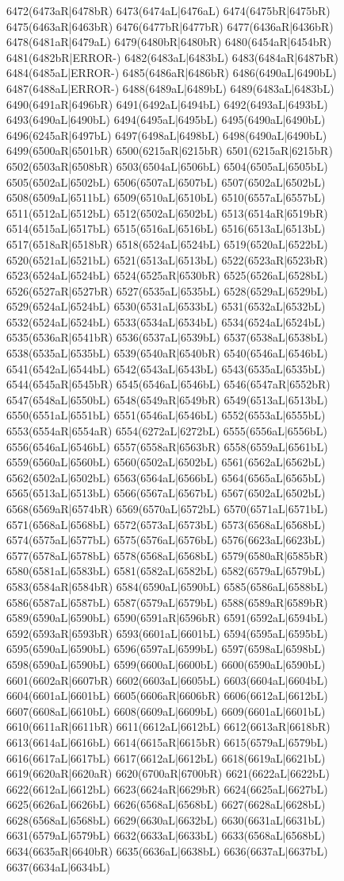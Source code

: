 6472(6473aR|6478bR) 6473(6474aL|6476aL) 6474(6475bR|6475bR) 6475(6463aR|6463bR) 6476(6477bR|6477bR) 6477(6436aR|6436bR) 6478(6481aR|6479aL) 6479(6480bR|6480bR) 6480(6454aR|6454bR) 6481(6482bR|ERROR-) 6482(6483aL|6483bL) 6483(6484aR|6487bR) 6484(6485aL|ERROR-) 6485(6486aR|6486bR) 6486(6490aL|6490bL) 6487(6488aL|ERROR-) 6488(6489aL|6489bL) 6489(6483aL|6483bL) 6490(6491aR|6496bR) 6491(6492aL|6494bL) 6492(6493aL|6493bL) 6493(6490aL|6490bL) 6494(6495aL|6495bL) 6495(6490aL|6490bL) 6496(6245aR|6497bL) 6497(6498aL|6498bL) 6498(6490aL|6490bL) 6499(6500aR|6501bR) 6500(6215aR|6215bR) 6501(6215aR|6215bR) 6502(6503aR|6508bR) 6503(6504aL|6506bL) 6504(6505aL|6505bL) 6505(6502aL|6502bL) 6506(6507aL|6507bL) 6507(6502aL|6502bL) 6508(6509aL|6511bL) 6509(6510aL|6510bL) 6510(6557aL|6557bL) 6511(6512aL|6512bL) 6512(6502aL|6502bL) 6513(6514aR|6519bR) 6514(6515aL|6517bL) 6515(6516aL|6516bL) 6516(6513aL|6513bL) 6517(6518aR|6518bR) 6518(6524aL|6524bL) 6519(6520aL|6522bL) 6520(6521aL|6521bL) 6521(6513aL|6513bL) 6522(6523aR|6523bR) 6523(6524aL|6524bL) 6524(6525aR|6530bR) 6525(6526aL|6528bL) 6526(6527aR|6527bR) 6527(6535aL|6535bL) 6528(6529aL|6529bL) 6529(6524aL|6524bL) 6530(6531aL|6533bL) 6531(6532aL|6532bL) 6532(6524aL|6524bL) 6533(6534aL|6534bL) 6534(6524aL|6524bL) 6535(6536aR|6541bR) 6536(6537aL|6539bL) 6537(6538aL|6538bL) 6538(6535aL|6535bL) 6539(6540aR|6540bR) 6540(6546aL|6546bL) 6541(6542aL|6544bL) 6542(6543aL|6543bL) 6543(6535aL|6535bL) 6544(6545aR|6545bR) 6545(6546aL|6546bL) 6546(6547aR|6552bR) 6547(6548aL|6550bL) 6548(6549aR|6549bR) 6549(6513aL|6513bL) 6550(6551aL|6551bL) 6551(6546aL|6546bL) 6552(6553aL|6555bL) 6553(6554aR|6554aR) 6554(6272aL|6272bL) 6555(6556aL|6556bL) 6556(6546aL|6546bL) 6557(6558aR|6563bR) 6558(6559aL|6561bL) 6559(6560aL|6560bL) 6560(6502aL|6502bL) 6561(6562aL|6562bL) 6562(6502aL|6502bL) 6563(6564aL|6566bL) 6564(6565aL|6565bL) 6565(6513aL|6513bL) 6566(6567aL|6567bL) 6567(6502aL|6502bL) 6568(6569aR|6574bR) 6569(6570aL|6572bL) 6570(6571aL|6571bL) 6571(6568aL|6568bL) 6572(6573aL|6573bL) 6573(6568aL|6568bL) 6574(6575aL|6577bL) 6575(6576aL|6576bL) 6576(6623aL|6623bL) 6577(6578aL|6578bL) 6578(6568aL|6568bL) 6579(6580aR|6585bR) 6580(6581aL|6583bL) 6581(6582aL|6582bL) 6582(6579aL|6579bL) 6583(6584aR|6584bR) 6584(6590aL|6590bL) 6585(6586aL|6588bL) 6586(6587aL|6587bL) 6587(6579aL|6579bL) 6588(6589aR|6589bR) 6589(6590aL|6590bL) 6590(6591aR|6596bR) 6591(6592aL|6594bL) 6592(6593aR|6593bR) 6593(6601aL|6601bL) 6594(6595aL|6595bL) 6595(6590aL|6590bL) 6596(6597aL|6599bL) 6597(6598aL|6598bL) 6598(6590aL|6590bL) 6599(6600aL|6600bL) 6600(6590aL|6590bL) 6601(6602aR|6607bR) 6602(6603aL|6605bL) 6603(6604aL|6604bL) 6604(6601aL|6601bL) 6605(6606aR|6606bR) 6606(6612aL|6612bL) 6607(6608aL|6610bL) 6608(6609aL|6609bL) 6609(6601aL|6601bL) 6610(6611aR|6611bR) 6611(6612aL|6612bL) 6612(6613aR|6618bR) 6613(6614aL|6616bL) 6614(6615aR|6615bR) 6615(6579aL|6579bL) 6616(6617aL|6617bL) 6617(6612aL|6612bL) 6618(6619aL|6621bL) 6619(6620aR|6620aR) 6620(6700aR|6700bR) 6621(6622aL|6622bL) 6622(6612aL|6612bL) 6623(6624aR|6629bR) 6624(6625aL|6627bL) 6625(6626aL|6626bL) 6626(6568aL|6568bL) 6627(6628aL|6628bL) 6628(6568aL|6568bL) 6629(6630aL|6632bL) 6630(6631aL|6631bL) 6631(6579aL|6579bL) 6632(6633aL|6633bL) 6633(6568aL|6568bL) 6634(6635aR|6640bR) 6635(6636aL|6638bL) 6636(6637aL|6637bL) 6637(6634aL|6634bL) 
